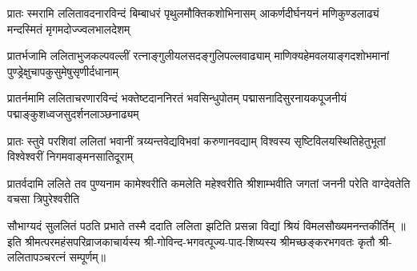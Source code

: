 
\fourlineindentedshloka
{प्रातः स्मरामि ललितावदनारविन्दं}
{बिम्बाधरं पृथुलमौक्तिकशोभिनासम्}
{आकर्णदीर्घनयनं मणिकुण्डलाढ्यं}
{मन्दस्मितं मृगमदोज्ज्वलभालदेशम्}

\fourlineindentedshloka
{प्रातर्भजामि ललिताभुजकल्पवल्लीं}
{रत्नाङ्गुलीयलसदङ्गुलिपल्लवाढ्याम्}
{माणिक्यहेमवलयाङ्गदशोभमानां}
{पुण्ड्रेक्षुचापकुसुमेषुसृणीर्दधानाम्}

\fourlineindentedshloka
{प्रातर्नमामि ललिताचरणारविन्दं}
{भक्तेष्टदाननिरतं भवसिन्धुपोतम्}
{पद्मासनादिसुरनायकपूजनीयं}
{पद्माङ्कुशध्वजसुदर्शनलाञ्छनाढ्यम्}

\fourlineindentedshloka
{प्रातः स्तुवे परशिवां ललितां भवानीं}
{त्रय्यन्तवेद्यविभवां करुणानवद्याम्}
{विश्वस्य सृष्टिविलयस्थितिहेतुभूतां}
{विश्वेश्वरीं निगमवाङ्मनसातिदूराम्}

\fourlineindentedshloka
{प्रातर्वदामि ललिते तव पुण्यनाम}
{कामेश्वरीति कमलेति महेश्वरीति}
{श्रीशाम्भवीति जगतां जननी परेति}
{वाग्देवतेति वचसा त्रिपुरेश्वरीति}

{सौभाग्यदं सुललितं पठति प्रभाते}
{तस्मै ददाति ललिता झटिति प्रसन्ना}
{विद्यां श्रियं विमलसौख्यमनन्तकीर्तिम्}
॥इति श्रीमत्परमहंसपरिव्राजकाचार्यस्य श्री-गोविन्द-भगवत्पूज्य-पाद-शिष्यस्य
श्रीमच्छङ्करभगवतः कृतौ  श्री-ललितापञ्चरत्नं सम्पूर्णम्॥